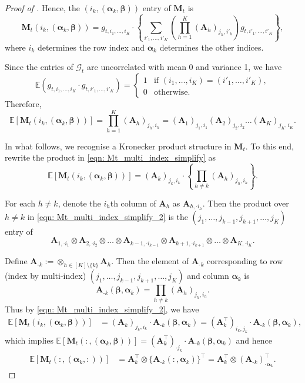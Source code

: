 \documentclass[aos]{imsart}
\theoremstyle{plain}
\theoremstyle{definition}
\def\E{\mathbb{E}}
\def\cG{\mathcal{G}} \def\cH{\boldsymbol{\mathcal{H}}} \def\cI{\mathcal{I}}
\def\bA{\mathbf{A}}
\def\bM{\mathbf{M}}
\def\balpha{\boldsymbol{\alpha}}
\def\bbeta{\boldsymbol{\beta}}
\def\trans{\intercal}
\begin{document}
\begin{proof}[Proof of ]
Hence, the $(i_k, (\balpha_k, \bbeta))$ entry of $\bM_t$ is
\[
\bM_t(i_k, (\balpha_k, \bbeta)) = g_{t,i_1, \dots, i_K} \cdot \left\{ \sum_{i'_1, \dots, i'_K} \left( \prod_{h=1}^K (\bA_h)_{j_h, i'_h} \right) g_{t,i'_1, \dots, i'_K} \right\},
\]
where $i_k$ determines the row index and $\balpha_k$ determines the other indices.


Since the entries of $\cG_t$ are uncorrelated with mean 0 and variance 1, we have
\[
\E(g_{t,i_1, \dots, i_K} \cdot g_{t,i'_1, \dots, i'_K}) = 
\begin{cases}
1 & \text{if } (i_1, \dots, i_K) = (i'_1, \dots, i'_K), \\
0 & \text{otherwise}.
\end{cases}
\]
Therefore,
\begin{equation}
\label{eqn: Mt_multi_index_simplify}
\E[\bM_t(i_k, (\balpha_k, \bbeta))] = \prod_{h=1}^K (\bA_h)_{j_h, i_h}
= (\bA_1)_{j_1, i_1} (\bA_2)_{j_2, i_2} \dots (\bA_K)_{j_K, i_K} .
\end{equation}

In what follows, we recognise a Kronecker product structure in $\bM_t$. To this end, rewrite the product in \eqref{eqn: Mt_multi_index_simplify} as
\begin{equation}
\label{eqn: Mt_multi_index_simplify_2}
\E[\bM_t(i_k, (\balpha_k, \bbeta))] = (\bA_k)_{j_k, i_k} \cdot \left\{ \prod_{h \neq k} (\bA_h)_{j_h, i_h} \right\}.
\end{equation}


For each $h \neq k$, denote the $i_h$th column of $\bA_h$ as $\bA_{h,\cdot i_h}$. Then the product over $h \neq k$ in \eqref{eqn: Mt_multi_index_simplify_2} is the $(j_1, \dots, j_{k-1}, j_{k+1}, \dots, j_K)$ entry of
\[
\bA_{1,\cdot i_1} \otimes \bA_{2,\cdot i_2} \otimes \dots \otimes \bA_{k-1,\cdot i_{k-1}} \otimes \bA_{k+1,\cdot i_{k+1}} \otimes \dots \otimes \bA_{K,\cdot i_K} .
\]

Define $\bA_{\text{-}k} := \otimes_{h\in[K] \setminus \{k\}} \bA_h$. Then the element of $\bA_{\text{-}k}$ corresponding to row (index by multi-index) $(j_1, \dots, j_{k-1}, j_{k+1}, \dots, j_K)$ and column $\balpha_k$ is 
\[
\bA_{\text{-}k}(\bbeta, \balpha_k) = \prod_{h \neq k} (\bA_h)_{j_h, i_h} .
\]
Thus by \eqref{eqn: Mt_multi_index_simplify_2}, we have
\begin{align*}
    \E[\bM_t(i_k, (\balpha_k, \bbeta))] &= (\bA_k)_{j_k, i_k} \cdot \bA_{\text{-}k}(\bbeta, \balpha_k)
    = (\bA_k^\trans)_{i_k, j_k} \cdot \bA_{\text{-}k}(\bbeta, \balpha_k) ,
\end{align*}
which implies $\E[\bM_t(:, (\balpha_k, \bbeta))] = (\bA_k^\trans)_{\cdot j_k} \cdot \bA_{\text{-}k}(\bbeta, \balpha_k)$ and hence
\begin{align*}
    \E[\bM_t(:, (\balpha_k, :))] &= \bA_k^\trans \otimes \{ \bA_{\text{-}k}(:, \balpha_k) \}^\trans 
    = \bA_k^\trans \otimes (\bA_{\text{-}k})_{\cdot \balpha_k}^\trans .
\end{align*}


\end{proof}
\end{document}
